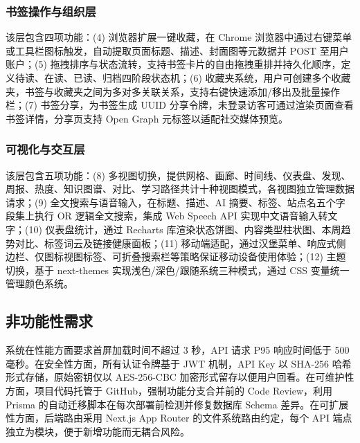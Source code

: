\documentclass[a4paper,12pt]{ctexart}
\begin{document}
\subsubsection{书签操作与组织层}

该层包含四项功能：(4) 浏览器扩展一键收藏，在 Chrome 浏览器中通过右键菜单或工具栏图标触发，自动提取页面标题、描述、封面图等元数据并 POST 至用户账户；(5) 拖拽排序与状态流转，支持书签卡片的自由拖拽重排并持久化顺序，定义待读、在读、已读、归档四阶段状态机；(6) 收藏夹系统，用户可创建多个收藏夹，书签与收藏夹之间为多对多关联关系，支持右键快速添加/移出及批量操作栏；(7) 书签分享，为书签生成 UUID 分享令牌，未登录访客可通过渲染页面查看书签详情，分享页支持 Open Graph 元标签以适配社交媒体预览。

\subsubsection{可视化与交互层}

该层包含五项功能：(8) 多视图切换，提供网格、画廊、时间线、仪表盘、发现、周报、热度、知识图谱、对比、学习路径共计十种视图模式，各视图独立管理数据请求；(9) 全文搜索与语音输入，在标题、描述、AI 摘要、标签、站点名五个字段集上执行 OR 逻辑全文搜索，集成 Web Speech API 实现中文语音输入转文字；(10) 仪表盘统计，通过 Recharts 库渲染状态饼图、内容类型柱状图、本周趋势对比、标签词云及链接健康面板；(11) 移动端适配，通过汉堡菜单、响应式侧边栏、仅图标视图标签、可折叠搜索栏等策略保证移动设备使用体验；(12) 主题切换，基于 next-themes 实现浅色/深色/跟随系统三种模式，通过 CSS 变量统一管理颜色系统。

\subsection{非功能性需求}

系统在性能方面要求首屏加载时间不超过 3 秒，API 请求 P95 响应时间低于 500 毫秒。在安全性方面，所有认证令牌基于 JWT 机制，API Key 以 SHA-256 哈希形式存储，原始密钥仅以 AES-256-CBC 加密形式留存以便用户回看。在可维护性方面，项目代码托管于 GitHub，强制功能分支合并前的 Code Review，利用 Prisma 的自动迁移脚本在每次部署前检测并修复数据库 Schema 差异。在可扩展性方面，后端路由采用 Next.js App Router 的文件系统路由约定，每个 API 端点独立为模块，便于新增功能而无耦合风险。

\end{document}
